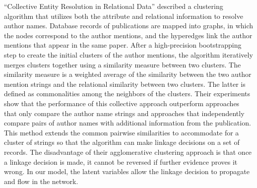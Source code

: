 \documentclass[]{article}
\begin{document}
``Collective Entity Resolution in Relational Data''  \cite{Bhattacharya2007} described a clustering algorithm that utilizes both the attribute and relational information to resolve author names.  Database records of publications are mapped into graphs, in which the nodes correspond to the author mentions, and the hyperedges link the author mentions that appear in the same paper.  After a high-precision bootstrapping step to create the initial clusters of the author mentions, the algorithm iteratively merges clusters together using a similarity measure between two clusters.  The similarity measure is a weighted average of the similarity between the two author mention strings and the relational similarity between two clusters.  The latter is defined as commonalities among the neighbors of the clusters.  Their experiments show that the performance of this collective approach outperform approaches that only compare the author name strings and approaches that independently compare pairs of author names with additional information from the publication.  This method extends the common pairwise similarities to accommodate for a cluster of strings so that the algorithm can make linkage decisions on a set of records.  The disadvantage of their agglomerative clustering approach is that once a linkage decision is made, it cannot be reversed if further evidence proves it wrong.  In our model, the latent variables allow the linkage decision to propagate and flow in the network.




\end{document}
